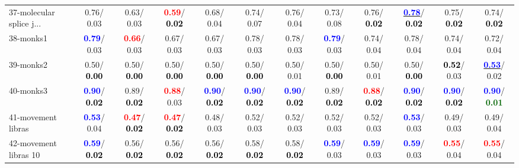 \begin{table}[h]
\begin{center}
{\begin{tabular}{lc|c|c|c|c|c|c|c|c|c|c}
37-molecular splice j... &   0.76/  0.03 &   0.63/  0.03 & \textcolor{red}{\textbf{  0.59}}/\textcolor{black}{\textbf{  0.02}} &   0.68/  0.04 &   0.74/  0.07 &   0.76/  0.04 &   0.73/  0.08 &   0.76/\textcolor{black}{\textbf{  0.02}} & \underline{\textcolor{blue}{\textbf{  0.78}}}/\textcolor{black}{\textbf{  0.02}} &   0.75/\textcolor{black}{\textbf{  0.02}} &   0.74/\textcolor{black}{\textbf{  0.02}} \\
38-monks1 & \textcolor{blue}{\textbf{  0.79}}/  0.03 & \textcolor{red}{\textbf{  0.66}}/  0.03 &   0.67/  0.03 &   0.67/  0.03 &   0.78/  0.03 &   0.78/  0.03 & \textcolor{blue}{\textbf{  0.79}}/  0.03 &   0.74/  0.04 &   0.78/  0.04 &   0.74/  0.04 &   0.72/  0.04 \\
39-monks2 &   0.50/\textcolor{black}{\textbf{  0.00}} &   0.50/\textcolor{black}{\textbf{  0.00}} &   0.50/\textcolor{black}{\textbf{  0.00}} &   0.50/\textcolor{black}{\textbf{  0.00}} &   0.50/\textcolor{black}{\textbf{  0.00}} &   0.50/  0.01 &   0.50/\textcolor{black}{\textbf{  0.00}} &   0.50/  0.01 &   0.50/\textcolor{black}{\textbf{  0.00}} & \textcolor{black}{\textbf{  0.52}}/  0.03 & \underline{\textcolor{blue}{\textbf{  0.53}}}/  0.02 \\ \hline
40-monks3 & \textcolor{blue}{\textbf{  0.90}}/\textcolor{black}{\textbf{  0.02}} &   0.89/\textcolor{black}{\textbf{  0.02}} & \textcolor{red}{\textbf{  0.88}}/  0.03 & \textcolor{blue}{\textbf{  0.90}}/\textcolor{black}{\textbf{  0.02}} & \textcolor{blue}{\textbf{  0.90}}/\textcolor{black}{\textbf{  0.02}} & \textcolor{blue}{\textbf{  0.90}}/\textcolor{black}{\textbf{  0.02}} &   0.89/\textcolor{black}{\textbf{  0.02}} & \textcolor{red}{\textbf{  0.88}}/\textcolor{black}{\textbf{  0.02}} & \textcolor{blue}{\textbf{  0.90}}/\textcolor{black}{\textbf{  0.02}} & \textcolor{blue}{\textbf{  0.90}}/\textcolor{black}{\textbf{  0.02}} & \textcolor{blue}{\textbf{  0.90}}/\textcolor{darkgreen}{\textbf{  0.01}} \\
41-movement libras & \textcolor{blue}{\textbf{  0.53}}/  0.04 & \textcolor{red}{\textbf{  0.47}}/\textcolor{black}{\textbf{  0.02}} & \textcolor{red}{\textbf{  0.47}}/\textcolor{black}{\textbf{  0.02}} &   0.48/  0.03 &   0.52/  0.03 &   0.52/  0.03 &   0.52/  0.03 &   0.52/  0.03 & \textcolor{blue}{\textbf{  0.53}}/  0.03 &   0.49/  0.03 &   0.49/  0.04 \\
42-movement libras 10 & \textcolor{blue}{\textbf{  0.59}}/\textcolor{black}{\textbf{  0.02}} &   0.56/\textcolor{black}{\textbf{  0.02}} &   0.56/\textcolor{black}{\textbf{  0.02}} &   0.56/\textcolor{black}{\textbf{  0.02}} &   0.58/\textcolor{black}{\textbf{  0.02}} &   0.58/\textcolor{black}{\textbf{  0.02}} & \textcolor{blue}{\textbf{  0.59}}/  0.03 & \textcolor{blue}{\textbf{  0.59}}/  0.03 & \textcolor{blue}{\textbf{  0.59}}/  0.03 & \textcolor{red}{\textbf{  0.55}}/  0.04 & \textcolor{red}{\textbf{  0.55}}/  0.04 \\

\end{tabular}}
\end{center}
\end{table}
